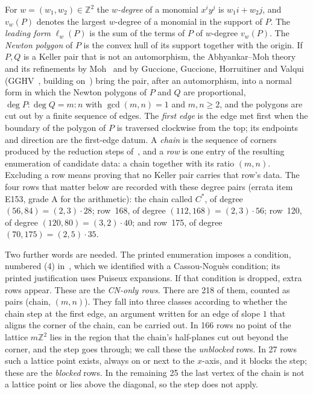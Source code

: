 \documentclass[a4paper,11pt]{article}
\theoremstyle{jsplain}
\theoremstyle{jsdef}
\theoremstyle{jsrem}
\begin{document}
For $w=(w_1,w_2)\in\mathbb Z^2$ the \emph{$w$-degree} of a monomial $x^iy^j$ is $w_1i+w_2j$, and $v_w(P)$ denotes the largest $w$-degree of a monomial in the support of $P$. The \emph{leading form} $\ell_w(P)$ is the sum of the terms of $P$ of $w$-degree $v_w(P)$. The \emph{Newton polygon} of $P$ is the convex hull of its support together with the origin. If $P,Q$ is a Keller pair that is not an automorphism, the Abhyankar--Moh theory and its refinements by Moh~\cite{Moh} and by Guccione, Guccione, Horruitiner and Valqui (GGHV~\cite{GGHV}, building on~\cite{GGV1}) bring the pair, after an automorphism, into a normal form in which the Newton polygons of $P$ and $Q$ are proportional, $\deg P:\deg Q=m:n$ with $\gcd(m,n)=1$ and $m,n\ge2$, and the polygons are cut out by a finite sequence of edges. The \emph{first edge} is the edge met first when the boundary of the polygon of $P$ is traversed clockwise from the top; its endpoints and direction are the first-edge datum. A \emph{chain} is the sequence of corners produced by the reduction steps of~\cite{GGV1,GGHV}, and a \emph{row} is one entry of the resulting enumeration of candidate data: a chain together with its ratio $(m,n)$. Excluding a row means proving that no Keller pair carries that row's data. The four rows that matter below are recorded with these degree pairs (errata item E153, grade A for the arithmetic): the chain called $C^*$, of degree $(56,84)=(2,3)\cdot28$; row~168, of degree $(112,168)=(2,3)\cdot56$; row~120, of degree $(120,80)=(3,2)\cdot40$; and row~175, of degree $(70,175)=(2,5)\cdot35$.

Two further words are needed. The printed enumeration imposes a condition, numbered (4) in~\cite{GGHV}, which we identified with a Cassou-Nogu\`es condition; its printed justification uses Puiseux expansions. If that condition is dropped, extra rows appear. These are the \emph{CN-only rows}. There are 218 of them, counted as pairs (chain, $(m,n)$). They fall into three classes according to whether the chain step at the first edge, an argument written for an edge of slope $1$ that aligns the corner of the chain, can be carried out. In 166 rows no point of the lattice $m\mathbb Z^2$ lies in the region that the chain's half-planes cut out beyond the corner, and the step goes through; we call these the \emph{unblocked} rows. In 27 rows such a lattice point exists, always on or next to the $x$-axis, and it blocks the step; these are the \emph{blocked} rows. In the remaining 25 the last vertex of the chain is not a lattice point or lies above the diagonal, so the step does not apply.
\end{document}
